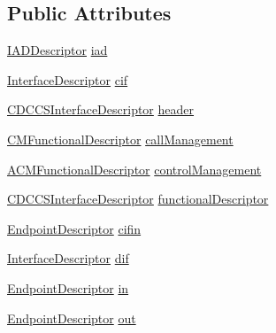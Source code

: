 \subsection*{Public Attributes}
\begin{DoxyCompactItemize}
\item 
\hyperlink{struct_i_a_d_descriptor}{I\-A\-D\-Descriptor} \hyperlink{struct_c_d_c_descriptor_a42c277dcdc03a000bb15a468104c996a}{iad}
\item 
\hyperlink{struct_interface_descriptor}{Interface\-Descriptor} \hyperlink{struct_c_d_c_descriptor_ad3afcf5687ec1055195bd94a1f36d269}{cif}
\item 
\hyperlink{struct_c_d_c_c_s_interface_descriptor}{C\-D\-C\-C\-S\-Interface\-Descriptor} \hyperlink{struct_c_d_c_descriptor_a3f84b78e1d78e821a539564e57375cf5}{header}
\item 
\hyperlink{struct_c_m_functional_descriptor}{C\-M\-Functional\-Descriptor} \hyperlink{struct_c_d_c_descriptor_a20b4bdfac02495e248d9cc0c2f10bda8}{call\-Management}
\item 
\hyperlink{struct_a_c_m_functional_descriptor}{A\-C\-M\-Functional\-Descriptor} \hyperlink{struct_c_d_c_descriptor_a958194b94ef21f282168a1c15d9527f7}{control\-Management}
\item 
\hyperlink{struct_c_d_c_c_s_interface_descriptor}{C\-D\-C\-C\-S\-Interface\-Descriptor} \hyperlink{struct_c_d_c_descriptor_a7ecaf88d51cad3091ba16c3efabd27ad}{functional\-Descriptor}
\item 
\hyperlink{struct_endpoint_descriptor}{Endpoint\-Descriptor} \hyperlink{struct_c_d_c_descriptor_a7fc244ee56a9337010aff080038b6400}{cifin}
\item 
\hyperlink{struct_interface_descriptor}{Interface\-Descriptor} \hyperlink{struct_c_d_c_descriptor_ad9e994faf01eac6b9a5ae31d2c028e02}{dif}
\item 
\hyperlink{struct_endpoint_descriptor}{Endpoint\-Descriptor} \hyperlink{struct_c_d_c_descriptor_af7c4a71ccaa04b9158318b02d64522e6}{in}
\item 
\hyperlink{struct_endpoint_descriptor}{Endpoint\-Descriptor} \hyperlink{struct_c_d_c_descriptor_a24ee64d6d086973e16e7a8cd232da817}{out}
\end{DoxyCompactItemize}


